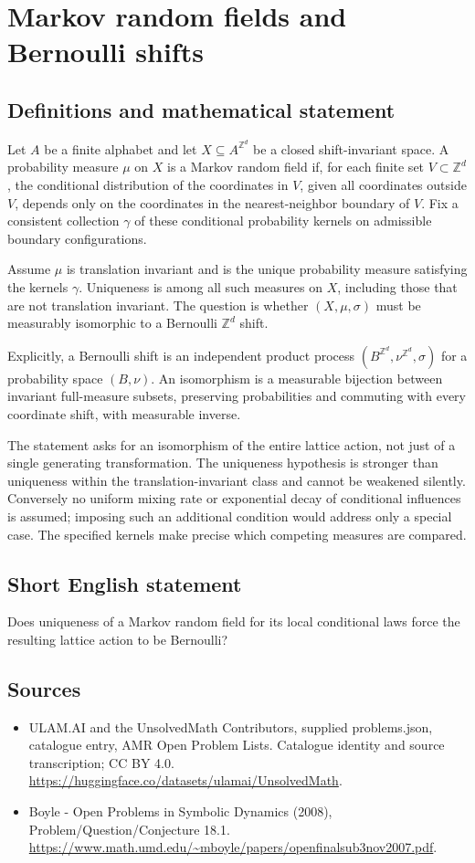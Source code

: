 \documentclass[11pt,a4paper]{article}
\begin{document}
\section*{Markov random fields and Bernoulli shifts}\label{statement}

\subsection{Definitions and mathematical statement}
Let $A$ be a finite alphabet and let $X\subseteq A^{\mathbb Z^d}$ be a
closed shift-invariant space. A probability measure $\mu$ on $X$ is a
Markov random field if, for each finite set $V\subset\mathbb Z^d$, the
conditional distribution of the coordinates in $V$, given all coordinates
outside $V$, depends only on the coordinates in the nearest-neighbor
boundary of $V$. Fix a consistent collection $\gamma$ of these conditional
probability kernels on admissible boundary configurations.

Assume $\mu$ is translation invariant and is the unique probability
measure satisfying the kernels $\gamma$. Uniqueness is among all such
measures on $X$, including those that are not translation invariant.
The question is whether $(X,\mu,\sigma)$ must be measurably isomorphic
to a Bernoulli $\mathbb Z^d$ shift.

Explicitly, a Bernoulli shift is an independent product process
$(B^{\mathbb Z^d},\nu^{\mathbb Z^d},\sigma)$ for a probability space
$(B,\nu)$. An isomorphism is a measurable bijection between invariant
full-measure subsets, preserving probabilities and commuting with every
coordinate shift, with measurable inverse.

The statement asks for an isomorphism of the entire lattice action,
not just of a single generating transformation. The uniqueness
hypothesis is stronger than uniqueness within the translation-invariant
class and cannot be weakened silently. Conversely no uniform mixing
rate or exponential decay of conditional influences is assumed; imposing
such an additional condition would address only a special case. The
specified kernels make precise which competing measures are compared.
\subsection{Short English statement}
Does uniqueness of a Markov random field for its local conditional laws force the resulting lattice action to be Bernoulli?
\subsection{Sources}
\begin{itemize}
\item[S1] ULAM.AI and the UnsolvedMath Contributors, supplied problems.json, catalogue entry, AMR Open Problem Lists. Catalogue identity and source transcription; CC BY 4.0.
\url{https://huggingface.co/datasets/ulamai/UnsolvedMath}.
\item[S2] Boyle - Open Problems in Symbolic Dynamics (2008), Problem/Question/Conjecture 18.1. 
\url{https://www.math.umd.edu/~mboyle/papers/openfinalsub3nov2007.pdf}.
\end{itemize}
\end{document}
